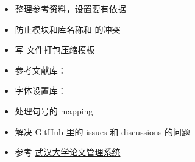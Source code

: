 \begin{itemize}[midpenalty=-1000,
  label=\protect\raisebox{-.3ex}{\NotDone}]
\begin{enumerate}
\begin{itemize}[midpenalty=-1000,
          label=\protect\raisebox{-.3ex}{\NotDone}]
          \item {}: 本科。参考最新的 2024 的本科模板。
          \item {}: 硕士
          \item {}: 博士
          \item {}: 数学与统计学院，兼容黄正华老师的模板配置。参考
            \begin{itemize}
              \item {}
              \item 黄正华老师的模板
            \end{itemize}
            子库：
            \begin{itemize}
              \item {}
              \item {}
              \item {}
            \end{itemize}
          \item {}: 计算机学院。参考 \href{https://github.com/cylqqqcyl/whu-thesis-2024}{cylqqqcyl 针对计算机学院改的模板}
          \item {}: 国家网络安全学院。参考网安用户上传的模板
        \end{itemize}
    \end{enumerate}
  \item 整理参考资料，设置要有依据
  \item[\Done] 防止模块和库名称和 \CusTeX 的冲突
  \item 写  文件打包压缩模板
  \item 参考文献库：
  \item 字体设置库：
  \item 处理句号的 mapping
  \item 解决  GitHub 里的 issues 和 discussions 的问题
  \item 参考 \href{http://paper.lib.whu.edu.cn/newlist.action?encid=44}{武汉大学论文管理系统} 
\end{itemize}